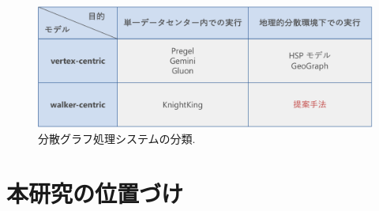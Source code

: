 \begin{figure}[t]
    \centering
    \includegraphics[scale=0.5]{figure/DistributedSystem.pdf}
    \caption{分散グラフ処理システムの分類.}
    \label{分散グラフ処理システムの分類}
\end{figure}

\section{本研究の位置づけ}



